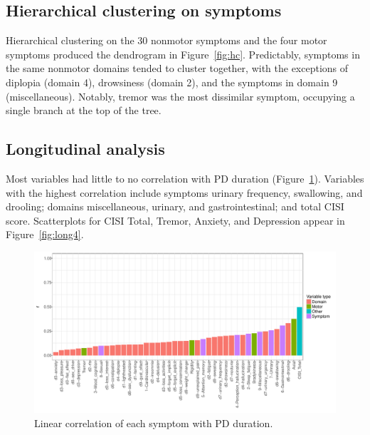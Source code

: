 \documentclass[preprint,5p]{elsarticle} %
\begin{document}
\subsection{Hierarchical clustering on symptoms}

Hierarchical clustering on the 30 nonmotor symptoms and the four motor symptoms produced the
dendrogram in Figure~\ref{fig:hc}. Predictably, symptoms in the same nonmotor domains tended to
cluster together, with the exceptions of diplopia (domain 4), drowsiness (domain 2), and the
symptoms in domain 9 (miscellaneous). Notably, tremor was the most dissimilar symptom, occupying a
single branch at the top of the tree.

\subsection{Longitudinal analysis}

Most variables had little to no correlation with PD duration (Figure~\ref{fig:corr}). Variables
with the highest correlation include symptoms urinary frequency, swallowing, and drooling; domains
miscellaneous, urinary, and gastrointestinal; and total CISI score. Scatterplots for CISI Total,
Tremor, Anxiety, and Depression appear in Figure~\ref{fig:long4}.

\begin{figure}[p]
  \centering
  \includegraphics[width=\linewidth]{cor-unbinned.pdf}
  \caption{Linear correlation of each symptom with PD duration.}
  \label{fig:corr}
\end{figure}
\end{document}
